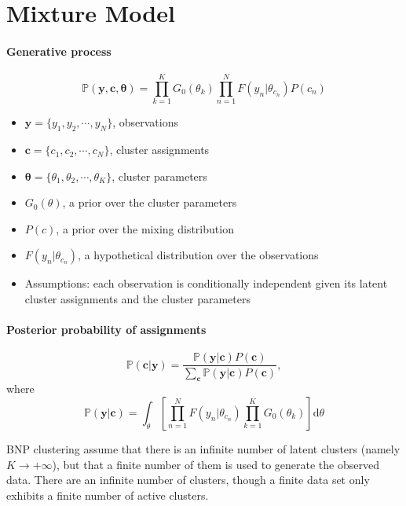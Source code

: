 \section{Mixture Model}

\paragraph{Generative process}

\begin{equation}
\mathbb{P} (\mathbf{y}, \mathbf{c}, \bm \theta) = \prod_{k=1}^K G_0 (\theta_k) \prod_{n=1}^N F(y_n | \theta_{c_n}) P(c_n)
\end{equation}

\begin{itemize}
\item $\mathbf{y} = \{y_1, y_2, \cdots, y_N \}$, observations
\item $\mathbf{c} = \{c_1, c_2, \cdots, c_N \}$, cluster assignments
\item $\bm \theta = \{\theta_1, \theta_2, \cdots, \theta_K \}$, cluster parameters
\item $G_0(\theta)$, a prior over the cluster parameters
\item $P(c)$, a prior over the mixing distribution
\item $F(y_n|\theta_{c_n})$, a hypothetical distribution over the observations
\item Assumptions: each observation is conditionally independent given its latent cluster assignments and the cluster parameters
\end{itemize}

\paragraph{Posterior probability of assignments}

\begin{equation}
\mathbb{P} (\mathbf{c} | \mathbf{y}) = \frac{\mathbb{P}(\mathbf{y} | \mathbf{c}) P(\mathbf{c})}{\sum_{\mathbf{c}} \mathbb{P}(\mathbf{y} | \mathbf{c}) P(\mathbf{c})},
\end{equation}
where
\begin{equation}
\mathbb{P}(\mathbf{y} | \mathbf{c}) = \int_\theta \left[ \prod_{n=1}^N F(y_n | \theta_{c_n}) \prod_{k=1}^K G_0 (\theta_k) \right] \text{d} \theta
\end{equation}


BNP clustering assume that there is an infinite number of latent clusters (namely $K \rightarrow +\infty$), but that a finite number of them is used to generate the observed data. There are an infinite number of clusters, though a finite data set only exhibits a finite number of active clusters.